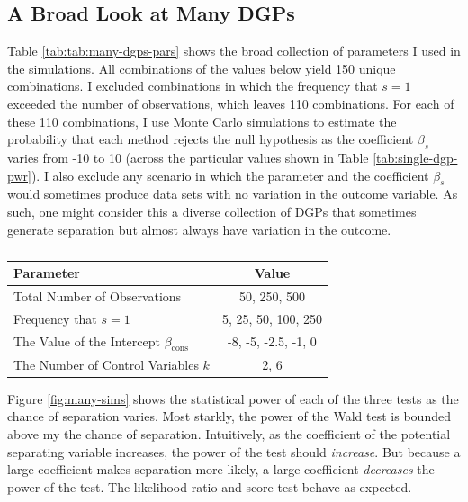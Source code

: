 \documentclass[
]{article}
\begin{document}
\hypertarget{a-broad-look-at-many-dgps}{%
\subsection{A Broad Look at Many DGPs}\label{a-broad-look-at-many-dgps}}

Table \ref{tab:tab:many-dgps-pars} shows the broad collection of
parameters I used in the simulations. All combinations of the values
below yield 150 unique combinations. I excluded combinations in which
the frequency that \(s = 1\) exceeded the number of observations, which
leaves 110 combinations. For each of these 110 combinations, I use Monte
Carlo simulations to estimate the probability that each method rejects
the null hypothesis as the coefficient \(\beta_s\) varies from -10 to 10
(across the particular values shown in Table \ref{tab:single-dgp-pwr}).
I also exclude any scenario in which the parameter and the coefficient
\(\beta_s\) would sometimes produce data sets with no variation in the
outcome variable. As such, one might consider this a diverse collection
of DGPs that sometimes generate separation but almost always have
variation in the outcome.

\renewcommand{\captiontext}{}
\renewcommand{\notetext}{}
\begin{table}[!h]
\caption{\label{tab:many-dgps-pars}}
\centering
\fontsize{10}{12}\selectfont
\begin{threeparttable}
\begin{tabular}{lc}
\toprule
Parameter & Value        \\
\midrule
Total Number of Observations & 50, 250, 500 \\
Frequency that $s = 1$    &   5, 25, 50, 100, 250 \\
The Value of the Intercept $\beta_{\text{cons}}$ & -8, -5, -2.5, -1, 0 \\
The Number of Control Variables $k$ & 2, 6 \\
\bottomrule
\end{tabular}\begin{tablenotes}[para]

\end{tablenotes}
\end{threeparttable}
\end{table}

Figure \ref{fig:many-sims} shows the statistical power of each of the
three tests as the chance of separation varies. Most starkly, the power
of the Wald test is bounded above my the chance of separation.
Intuitively, as the coefficient of the potential separating variable
increases, the power of the test should \emph{increase}. But because a
large coefficient makes separation more likely, a large coefficient
\emph{decreases} the power of the test. The likelihood ratio and score
test behave as expected.
\end{document}

